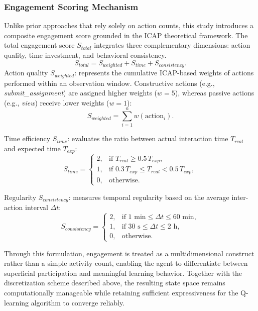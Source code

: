 \documentclass[9pt, conference, a4paper, compsocconf]{IEEEtran}
\begin{document}
\subsubsection{Engagement Scoring Mechanism}
Unlike prior approaches that rely solely on action counts, this study introduces a composite engagement score grounded in the ICAP theoretical framework. The total engagement score $S_{total}$ integrates three complementary dimensions: action quality, time investment, and behavioral consistency.
\begin{equation}
S_{total} = S_{weighted} + S_{time} + S_{consistency}.
\end{equation}
Action quality $S_{weighted}$: represents the cumulative ICAP-based weights of actions performed within an observation window. Constructive actions (e.g., \textit{submit\_assignment}) are assigned higher weights ($w=5$), whereas passive actions (e.g., \textit{view}) receive lower weights ($w=1$):
\[
S_{weighted} = \sum_{i=1}^{n} w(\text{action}_i).
\]

Time efficiency $S_{time}$: evaluates the ratio between actual interaction time $T_{real}$ and expected time $T_{exp}$:
\[
S_{time} =
\begin{cases}
2, & \text{if } T_{real} \ge 0.5\,T_{exp}, \\
1, & \text{if } 0.3\,T_{exp} \le T_{real} < 0.5\,T_{exp}, \\
0, & \text{otherwise}.
\end{cases}
\]

Regularity $S_{consistency}$: measures temporal regularity based on the average inter-action interval $\Delta t$:
\[
S_{consistency} =
\begin{cases}
2, & \text{if } 1\text{ min} \le \Delta t \le 60\text{ min}, \\
1, & \text{if } 30\text{ s} \le \Delta t \le 2\text{ h}, \\
0, & \text{otherwise}.
\end{cases}
\]

Through this formulation, engagement is treated as a multidimensional construct rather than a simple activity count, enabling the agent to differentiate between superficial participation and meaningful learning behavior. Together with the discretization scheme described above, the resulting state space remains computationally manageable while retaining sufficient expressiveness for the Q-learning algorithm to converge reliably.
\end{document}
